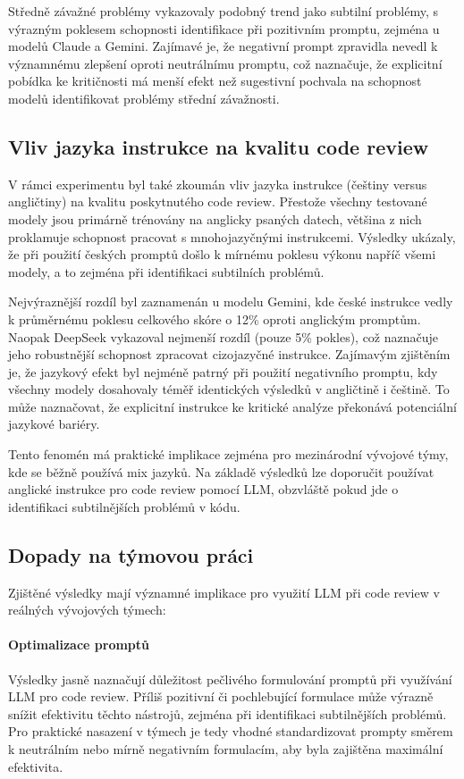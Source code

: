 \documentclass[12pt, a4paper]{article}
\begin{document}
Středně závažné problémy vykazovaly podobný trend jako subtilní problémy, s výrazným poklesem schopnosti identifikace při pozitivním promptu, zejména u modelů Claude a Gemini. Zajímavé je, že negativní prompt zpravidla nevedl k významnému zlepšení oproti neutrálnímu promptu, což naznačuje, že explicitní pobídka ke kritičnosti má menší efekt než sugestivní pochvala na schopnost modelů identifikovat problémy střední závažnosti.

\subsection{Vliv jazyka instrukce na kvalitu code review}
V rámci experimentu byl také zkoumán vliv jazyka instrukce (češtiny versus angličtiny) na kvalitu poskytnutého code review. Přestože všechny testované modely jsou primárně trénovány na anglicky psaných datech, většina z nich proklamuje schopnost pracovat s mnohojazyčnými instrukcemi. Výsledky ukázaly, že při použití českých promptů došlo k mírnému poklesu výkonu napříč všemi modely, a to zejména při identifikaci subtilních problémů.

Nejvýraznější rozdíl byl zaznamenán u modelu Gemini, kde české instrukce vedly k průměrnému poklesu celkového skóre o 12\% oproti anglickým promptům. Naopak DeepSeek vykazoval nejmenší rozdíl (pouze 5\% pokles), což naznačuje jeho robustnější schopnost zpracovat cizojazyčné instrukce. Zajímavým zjištěním je, že jazykový efekt byl nejméně patrný při použití negativního promptu, kdy všechny modely dosahovaly téměř identických výsledků v angličtině i češtině. To může naznačovat, že explicitní instrukce ke kritické analýze překonává potenciální jazykové bariéry.

Tento fenomén má praktické implikace zejména pro mezinárodní vývojové týmy, kde se běžně používá mix jazyků. Na základě výsledků lze doporučit používat anglické instrukce pro code review pomocí LLM, obzvláště pokud jde o identifikaci subtilnějších problémů v kódu.

\subsection{Dopady na týmovou práci}
Zjištěné výsledky mají významné implikace pro využití LLM při code review v reálných vývojových týmech:

\paragraph{Optimalizace promptů} Výsledky jasně naznačují důležitost pečlivého formulování promptů při využívání LLM pro code review. Příliš pozitivní či pochlebující formulace může výrazně snížit efektivitu těchto nástrojů, zejména při identifikaci subtilnějších problémů. Pro praktické nasazení v týmech je tedy vhodné standardizovat prompty směrem k neutrálním nebo mírně negativním formulacím, aby byla zajištěna maximální efektivita.
\end{document}
